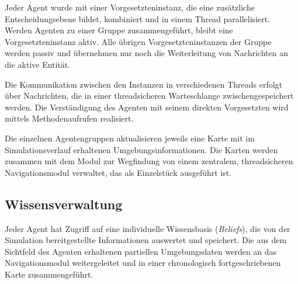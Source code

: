 \documentclass[runningheads]{llncs}
\begin{document}
	Jeder Agent wurde mit einer Vorgesetzteninstanz, die eine zusätzliche Entscheidungsebene bildet, kombiniert und in einem Thread parallelisiert. Werden Agenten zu einer Gruppe zusammengeführt, bleibt eine Vorgesetzteninstanz aktiv. Alle übrigen Vorgesetzteninstanzen der Gruppe werden passiv und übernehmen nur noch die Weiterleitung von Nachrichten an die aktive Entität.
	
	Die Kommunikation zwischen den Instanzen in verschiedenen Threads erfolgt über Nachrichten, die in einer threadsicheren Warteschlange zwischengespeichert werden. Die Verständigung des Agenten mit seinem direkten Vorgesetzten wird mittels Methodenaufrufen realisiert.
	
	Die einzelnen Agentengruppen aktualisieren jeweils eine Karte mit im Simulationsverlauf erhaltenen Umgebungsinformationen. Die Karten werden zusammen mit dem Modul zur Wegfindung von einem zentralem, threadsicheren Navigationsmodul verwaltet, das als Einzelstück ausgeführt ist. 
	
	
	\subsection{Wissensverwaltung}\label{wissensverwaltung}
	Jeder Agent hat Zugriff auf eine individuelle Wissensbasis (\textit{Beliefs}), die von der Simulation bereitgestellte Informationen auswertet und speichert.
	Die aus dem Sichtfeld des Agenten erhaltenen partiellen Umgebungsdaten werden an das Navigationsmodul weitergeleitet und in einer chronologisch fortgeschriebenen Karte zusammengeführt.
	
\end{document}
